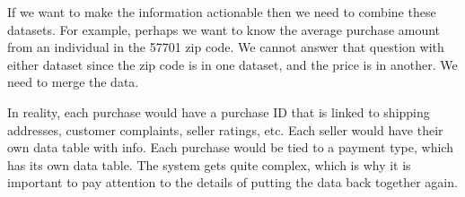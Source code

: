 \documentclass[]{book}
\newenvironment{Shaded}{\begin{snugshade}}{\end{snugshade}}
\newcommand{\CommentTok}[1]{\textcolor[rgb]{0.56,0.35,0.01}{\textit{#1}}}
\newcommand{\KeywordTok}[1]{\textcolor[rgb]{0.13,0.29,0.53}{\textbf{#1}}}
\newcommand{\NormalTok}[1]{#1}
\newcommand{\OperatorTok}[1]{\textcolor[rgb]{0.81,0.36,0.00}{\textbf{#1}}}
\newcommand{\StringTok}[1]{\textcolor[rgb]{0.31,0.60,0.02}{#1}}
\theoremstyle{definition}
\theoremstyle{definition}
\theoremstyle{definition}
\theoremstyle{remark}
\begin{document}
If we want to make the information actionable then we need to combine
these datasets. For example, perhaps we want to know the average
purchase amount from an individual in the 57701 zip code. We cannot
answer that question with either dataset since the zip code is in one
dataset, and the price is in another. We need to merge the data.

\begin{Shaded}
\end{Shaded}

In reality, each purchase would have a purchase ID that is linked to
shipping addresses, customer complaints, seller ratings, etc. Each
seller would have their own data table with info. Each purchase would be
tied to a payment type, which has its own data table. The system gets
quite complex, which is why it is important to pay attention to the
details of putting the data back together again.
\end{document}
